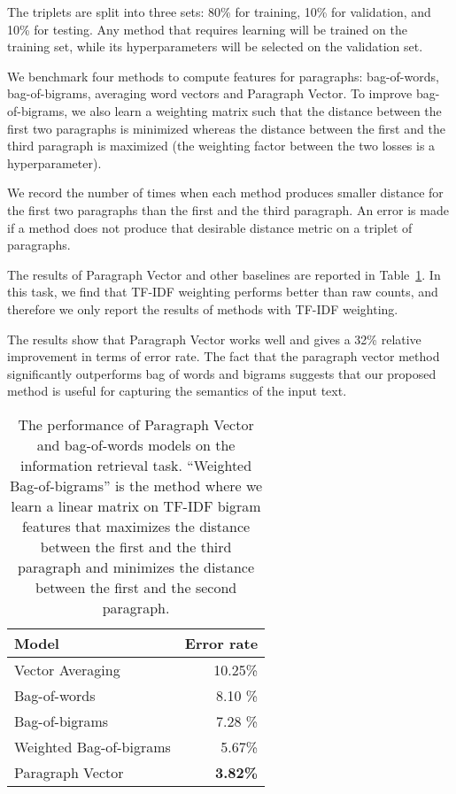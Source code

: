 \documentclass{article}
\begin{document}
The triplets are split into three sets: 80\% for training, 10\% for
validation, and 10\% for testing. Any method that requires learning
will be trained on the training set, while its hyperparameters will be
selected on the validation set.

We benchmark four methods to compute features for paragraphs:
bag-of-words, bag-of-bigrams, averaging word vectors and Paragraph
Vector. To improve bag-of-bigrams, we also learn a weighting matrix
such that the distance between the first two paragraphs is minimized
whereas the distance between the first and the third paragraph is
maximized (the weighting factor between the two losses is a
hyperparameter).

We record the number of times when each method produces smaller
distance for the first two paragraphs than the first and the third
paragraph. An error is made if a method does not produce that desirable
distance metric on a triplet of paragraphs.

The results of Paragraph Vector and other baselines are reported in
Table~\ref{tab:info}. In this task, we find that TF-IDF weighting
performs better than raw counts, and therefore we only report the
results of methods with TF-IDF weighting.

The results show that Paragraph Vector works well and gives a 32\%
relative improvement in terms of error rate. The fact that the
paragraph vector method significantly outperforms bag of words and
bigrams suggests that our proposed method is useful for capturing the
semantics of the input text.

\begin{table}[htb]
\caption{The performance of Paragraph Vector and bag-of-words models on the
  information retrieval task. ``Weighted Bag-of-bigrams'' is the
  method where we learn a linear matrix  on TF-IDF bigram features
  that maximizes the distance between the first and the third paragraph
  and minimizes the distance between the first and the second
  paragraph.}
\label{tab:info}
\begin{center}
\begin{tabular}{|l|r|} 
\hline
Model & Error rate \\ \hline
Vector Averaging & 10.25\% \\
Bag-of-words & 8.10 \% \\ 
Bag-of-bigrams & 7.28 \% \\
Weighted Bag-of-bigrams & 5.67\% \\ 
Paragraph Vector & {\bf 3.82\%} \\
\hline
\end {tabular}
\end {center}
\end {table}
\end{document}
